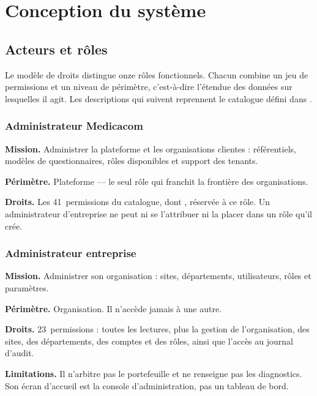\chapter{Conception du système}
\label{chap:conception}

\section{Acteurs et rôles}

Le modèle de droits distingue onze rôles fonctionnels. Chacun combine un jeu de
permissions et un niveau de périmètre, c'est-à-dire l'étendue des données sur
lesquelles il agit. Les descriptions qui suivent reprennent le catalogue défini dans
.

\subsection{Administrateur Medicacom}

\textbf{Mission.} Administrer la plateforme et les organisations clientes : référentiels,
modèles de questionnaires, rôles disponibles et support des tenants.

\textbf{Périmètre.} Plateforme — le seul rôle qui franchit la frontière des
organisations.

\textbf{Droits.} Les 41~permissions du catalogue, dont , réservée à
ce rôle. Un administrateur d'entreprise ne peut ni se l'attribuer ni la placer dans un
rôle qu'il crée.

\subsection{Administrateur entreprise}

\textbf{Mission.} Administrer son organisation : sites, départements, utilisateurs,
rôles et paramètres.

\textbf{Périmètre.} Organisation. Il n'accède jamais à une autre.

\textbf{Droits.} 23~permissions : toutes les lectures, plus la gestion de
l'organisation, des sites, des départements, des comptes et des rôles, ainsi que
l'accès au journal d'audit.

\textbf{Limitations.} Il n'arbitre pas le portefeuille et ne renseigne pas les
diagnostics. Son écran d'accueil est la console d'administration, pas un tableau de
bord.

